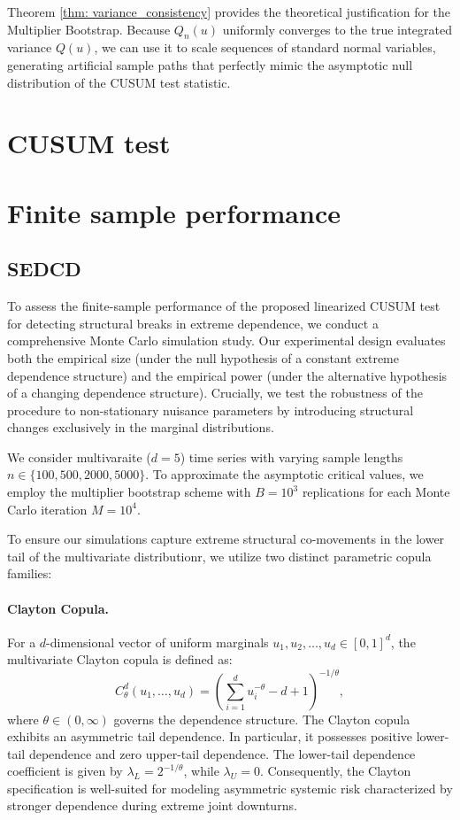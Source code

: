 \documentclass[12pt,a4paper]{article}
\theoremstyle{definition}
\theoremstyle{definition}
\theoremstyle{theorem}
\begin{document}
Theorem \ref{thm: variance_consistency} provides the theoretical justification for the Multiplier Bootstrap. Because $Q_n(u)$ uniformly converges to the true integrated variance $Q(u)$, we can use it to scale sequences of standard normal variables, generating artificial sample paths that perfectly mimic the asymptotic null distribution of the CUSUM test statistic.



\section{CUSUM test}

\section{Finite sample performance}
\subsection{SEDCD}

To assess the finite-sample performance of the proposed linearized CUSUM test for detecting structural breaks in extreme dependence, we conduct a comprehensive Monte Carlo simulation study. Our experimental design evaluates both the empirical size (under the null hypothesis of a constant extreme dependence structure) and the empirical power (under the alternative hypothesis of a changing dependence structure). Crucially, we test the robustness of the procedure to non-stationary nuisance parameters by introducing structural changes exclusively in the marginal distributions.

We consider multivaraite ($d=5$) time series with varying sample lengths $n \in \{100, 500, 2000, 5000\}$. To approximate the asymptotic critical values, we employ the multiplier bootstrap scheme with $B = 10^3$ replications for each Monte Carlo iteration $M=10^4$. 



To ensure our simulations capture extreme structural co-movements in the lower tail of the multivariate distributionr, we utilize two distinct parametric copula families:

\paragraph{ Clayton Copula.} For a $d$-dimensional vector of uniform marginals $u_1, u_2, \dots, u_d \in [0, 1]^d$, the multivariate Clayton copula is defined as:
\begin{equation}
    C_\theta^d(u_1, \dots, u_d) = \left( \sum_{i=1}^d u_i^{-\theta} - d + 1 \right)^{-1/\theta},
    \label{eq : Clayton}
\end{equation}
where $ \theta \in (0, \infty)$ governs the dependence  structure.
The Clayton copula exhibits an asymmetric tail dependence. In particular, it possesses positive lower-tail dependence and zero upper-tail dependence. The lower-tail dependence coefficient is given by $\lambda_L = 2^{-1/\theta}$, while  $\lambda_U = 0$. Consequently, the Clayton specification is well-suited for modeling asymmetric systemic risk characterized by stronger dependence during extreme joint downturns.
\end{document}
